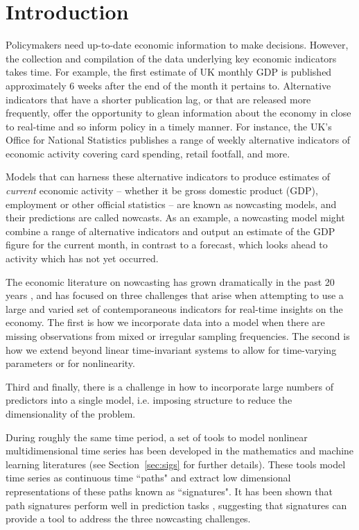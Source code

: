 \documentclass[a4paper, 12pt]{article}
\theoremstyle{remark}
\begin{document}
\clearpage

\onehalfspacing

\section{Introduction}

Policymakers need up-to-date economic information to make decisions. However, the collection and compilation of the data underlying key economic indicators takes time. For example, the first estimate of UK monthly GDP is published approximately 6 weeks after the end of the month it pertains to.  
Alternative indicators that have a shorter publication lag, or that are released more frequently, offer the opportunity to glean information about the economy in close to real-time and so inform policy in a timely manner. For instance, the UK's Office for National Statistics publishes a range of weekly alternative indicators of economic activity covering card spending, retail footfall, and more.

Models that can harness these alternative indicators to produce estimates of \textit{current} economic activity -- whether it be gross domestic product (GDP), employment or other official statistics -- are known as nowcasting models, and their predictions are called nowcasts. As an example, a nowcasting model might combine a range of alternative indicators and output an estimate of the GDP figure for the current month, in contrast to a forecast, which looks ahead to activity which has not yet occurred.

The economic literature on nowcasting has grown dramatically in the past 20 years \citep[e.g. see][]{stock2002forecasting,GiannoneReichlinSmall2006,bok2018macroeconomic}, and has focused on three challenges that arise when attempting to use a large and varied set of contemporaneous indicators for real-time insights on the economy. The first is how we incorporate data into a model when there are missing observations from mixed or irregular sampling frequencies. The second is how we extend beyond linear time-invariant systems to allow for time-varying parameters or for nonlinearity.

Third and finally, there is a challenge in how to incorporate large numbers of predictors into a single model, i.e. imposing structure to reduce the dimensionality of the problem.

During roughly the same time period, a set of tools to model nonlinear multidimensional time series has been developed in the mathematics and machine learning literatures (see Section~\ref{sec:sigs} for further details). These tools model time series as continuous time ``paths" and extract low dimensional representations of these paths known as ``signatures". It has been shown that path signatures perform well in prediction tasks \citep{graham2013sparse, morrill2020utilization}, suggesting that signatures can provide a tool to address the three nowcasting challenges.
\end{document}
